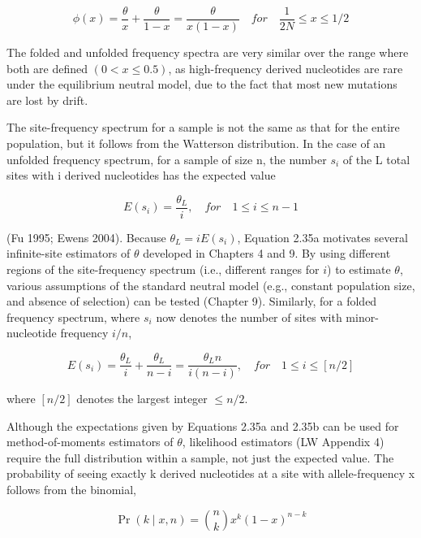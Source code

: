 \documentclass{article}
\begin{document}
\begin{equation}
\phi(x)=\frac{\theta}{x}+\frac{\theta}{1-x}=\frac{\theta}{x(1-x)}\quad for\quad\frac{1}{2N}\leq x\leq1/2
\tag{2.34b}
\label{eq:2_34b}
\end{equation}

The folded and unfolded frequency spectra are very similar over the range where both are defined  $ (0 < x \leq 0.5) $, as high-frequency derived nucleotides are rare under the equilibrium neutral model, due to the fact that most new mutations are lost by drift.

The site-frequency spectrum for a sample is not the same as that for the entire population, but it follows from the Watterson distribution. In the case of an unfolded frequency spectrum, for a sample of size n, the number  $ s_{i} $ of the L total sites with i derived nucleotides has the expected value

\begin{equation}
E(s_{i})=\frac{\theta_{L}}{i},\quad for\quad1\leq i\leq n-1
\tag{2.35a}
\label{eq:2_35a}
\end{equation}

(Fu 1995; Ewens 2004). Because  $ \theta_L = iE(s_i) $, Equation 2.35a motivates several infinite-site estimators of  $ \theta $ developed in Chapters 4 and 9. By using different regions of the site-frequency spectrum (i.e., different ranges for  $ i $) to estimate  $ \theta $, various assumptions of the standard neutral model (e.g., constant population size, and absence of selection) can be tested (Chapter 9). Similarly, for a folded frequency spectrum, where  $ s_i $ now denotes the number of sites with minor-nucleotide frequency  $ i/n $,

\begin{equation}
E(s_{i})=\frac{\theta_{L}}{i}+\frac{\theta_{L}}{n-i}=\frac{\theta_{L}n}{i(n-i)},\quad for\quad1\leq i\leq[n/2]
\tag{2.35b}
\label{eq:2_35b}
\end{equation}

where  $ [n/2] $ denotes the largest integer  $ \leq n/2 $.

Although the expectations given by Equations 2.35a and 2.35b can be used for method-of-moments estimators of  $ \theta $, likelihood estimators (LW Appendix 4) require the full distribution within a sample, not just the expected value. The probability of seeing exactly k derived nucleotides at a site with allele-frequency x follows from the binomial,

\begin{equation}
\Pr(k\mid x,n)=\binom{n}{k}x^{k}(1-x)^{n-k}
\tag{2.36a}
\label{eq:2_36a}
\end{equation}
\end{document}
